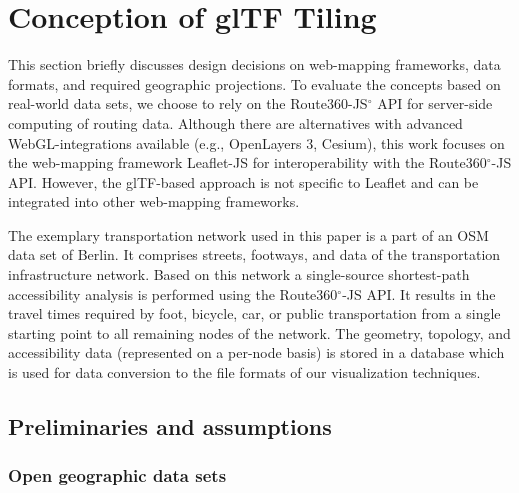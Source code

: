 
\cleardoublepage              %
\chapter{Conception of glTF Tiling}
  \label{chap:conct}
  This section briefly discusses design decisions on web-mapping frameworks, data
  formats, and required geographic projections. To evaluate the concepts based on
  real-world data sets, we choose to rely on the Route360-JS$^\circ$ API for server-side
  computing of routing data. Although there are alternatives with advanced WebGL-integrations
  available (e.g., OpenLayers 3, Cesium), this work focuses on the web-mapping framework
  Leaflet-JS for interoperability with the Route360$^\circ$-JS API. However, the
  glTF-based approach is not specific to Leaflet and can be integrated into other
  web-mapping frameworks.\par
  The exemplary transportation network used in this paper is a part of an OSM data
  set of Berlin. It comprises streets, footways, and data of the transportation
  infrastructure network. Based on this network a single-source shortest-path accessibility
  analysis \cite{Meyer2001} is performed using the Route360$^\circ$-JS API. It results in
  the travel times required by foot, bicycle, car, or public transportation from a
  single starting point to all remaining nodes of the network. The geometry, topology,
  and accessibility data (represented on a per-node basis) is stored in a database which
  is used for data conversion to the file formats of our visualization techniques.\par

  \section{Preliminaries and assumptions}
    \label{sec:conct:preli}
    \subsection{Open geographic data sets}
      \label{sec:conct:preli:odata}
